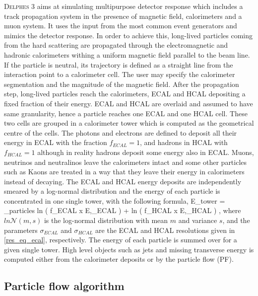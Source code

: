 \textsc{Delphes 3} aims at simulating multipurpose detector response which includes a track propagation system in the presence of magnetic field, calorimeters and a muon system. It uses the input from the most common event generators and mimics the detector response. In order to achieve this, long-lived particles coming from the hard scattering are propagated through the electromagnetic and hadronic calorimeters withing a uniform magnetic field parallel to the beam line. If the particle is neutral, its trajectory is defined as a straight line from the interaction point to a calorimeter cell. The user may specify the calorimeter segmentation and the magnitude of the magnetic field. After the propagation step, long-lived particles reach the calorimeters, ECAL and HCAL depositing a fixed fraction of their energy. ECAL and HCAL are overlaid and assumed to have same granularity, hence a particle reaches one ECAL and one HCAL cell. These two cells are grouped in a calorimeter tower which is computed as the geometrical centre of the cells. The photons and electrons are defined to deposit all their energy in ECAL with the fraction $f_{ECAL} = 1$, and hadrons in HCAL with $f_{HCAL} = 1$ although in reality hadrons deposit some energy also in ECAL. Muons, neutrinos and neutralinos leave the calorimeters intact and some other particles such as Kaons are treated in a way that they leave their energy in calorimeters instead of decaying. The ECAL and HCAL energy deposits are independently smeared by a log-normal distribution and the energy of each particle is concentrated in one single tower, with the following formula,
\be
E_{tower} = \sum_{particles} ln \left( f_{ECAL} \; x \; E,\sigma_{ECAL} \right) + ln \left( f_{HCAL} \; x \; E,\sigma_{HCAL} \right) \; ,
\ee
where $ln\mathcal{N}\left(m,s\right)$ is the log-normal distribution with mean $m$ and variance $s$, and the parameters $\sigma_{ECAL}$ and $\sigma_{HCAL}$ are the ECAL and HCAL resolutions given in \autoref{res_eq_ecal}, respectively. The energy of each particle is summed over for a given single tower. High level objects such as jets and missing transverse energy is computed either from the calorimeter deposits or by the particle flow (PF).

\subsection{Particle flow algorithm}\label{pf_section}

